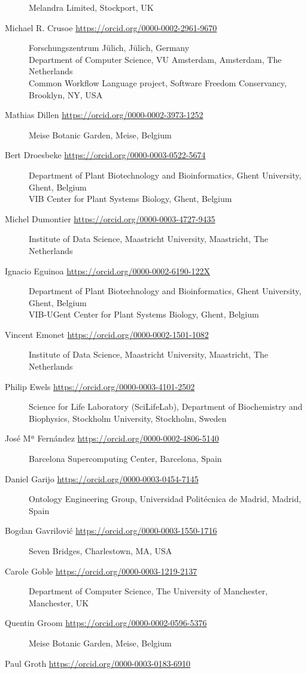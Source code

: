 \begin{description}
Melandra Limited, Stockport, UK
\item[Michael R. Crusoe \url{https://orcid.org/0000-0002-2961-9670}]
Forschungszentrum Jülich, Jülich, Germany\\
Department of Computer Science, VU Amsterdam, Amsterdam, The Netherlands\\
Common Workflow Language project, Software Freedom Conservancy,
Brooklyn, NY, USA
\item[Mathias Dillen \url{https://orcid.org/0000-0002-3973-1252}]
Meise Botanic Garden, Meise, Belgium
\item[Bert Droesbeke \url{https://orcid.org/0000-0003-0522-5674}]
Department of Plant Biotechnology and Bioinformatics, Ghent University,
Ghent, Belgium\\
VIB Center for Plant Systems Biology, Ghent, Belgium
\item[Michel Dumontier \url{https://orcid.org/0000-0003-4727-9435}]
Institute of Data Science, Maastricht University, Maastricht, The
Netherlands
\item[Ignacio Eguinoa \url{https://orcid.org/0000-0002-6190-122X}]
Department of Plant Biotechnology and Bioinformatics, Ghent University,
Ghent, Belgium\\
VIB-UGent Center for Plant Systems Biology, Ghent, Belgium
\item[Vincent Emonet \url{https://orcid.org/0000-0002-1501-1082}]
Institute of Data Science, Maastricht University, Maastricht, The
Netherlands
\item[Philip Ewels \url{https://orcid.org/0000-0003-4101-2502}]
Science for Life Laboratory (SciLifeLab), Department of Biochemistry and
Biophysics, Stockholm University, Stockholm, Sweden
\item[José Mª Fernández \url{https://orcid.org/0000-0002-4806-5140}]
Barcelona Supercomputing Center, Barcelona, Spain
\item[Daniel Garijo \url{https://orcid.org/0000-0003-0454-7145}]
Ontology Engineering Group, Universidad Politécnica de Madrid, Madrid,
Spain
\item[Bogdan Gavrilović \url{https://orcid.org/0000-0003-1550-1716}]
Seven Bridges, Charlestown, MA, USA
\item[Carole Goble \url{https://orcid.org/0000-0003-1219-2137}]
Department of Computer Science, The University of Manchester,
Manchester, UK
\item[Quentin Groom \url{https://orcid.org/0000-0002-0596-5376}]
Meise Botanic Garden, Meise, Belgium
\item[Paul Groth \url{https://orcid.org/0000-0003-0183-6910}]

\end{description}
